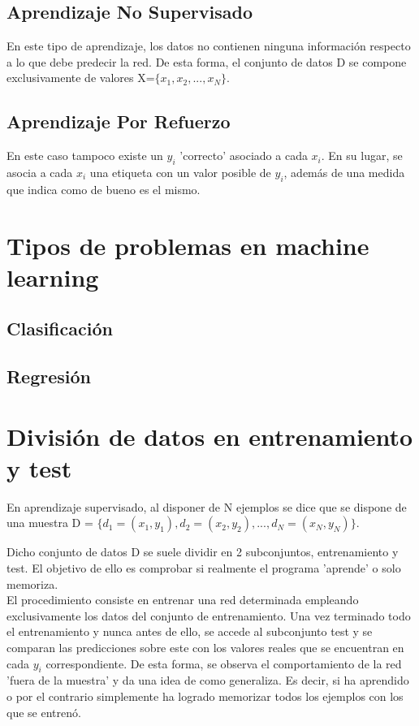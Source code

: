 \subsection{Aprendizaje No Supervisado}

En este tipo de aprendizaje, los datos no contienen ninguna información respecto a lo que debe predecir la red. De esta forma, el conjunto de datos D se compone exclusivamente de valores X=$\{x_1, x_2, ..., x_N\}$. \cite{Learning_From_Data}

\subsection{Aprendizaje Por Refuerzo}

En este caso tampoco existe un $y_i$ 'correcto' asociado a cada $x_i$. En su lugar, se asocia a cada $x_i$ una etiqueta con un valor posible de $y_i$, además de una medida que indica como de bueno es el mismo. \cite{Learning_From_Data}

\section{Tipos de problemas en machine learning}

\subsection{Clasificación}
\subsection{Regresión}


\section{División de datos en entrenamiento y test}

En aprendizaje supervisado, al disponer de N ejemplos se dice que se dispone de una muestra D = $\{d_1 = (x_1, y_1), d_2 = (x_2, y_2), ..., d_N = (x_N, y_N)\}$.

Dicho conjunto de datos D se suele dividir en 2 subconjuntos, entrenamiento y test. El objetivo de ello es comprobar si realmente el programa 'aprende' o solo memoriza.\\
El procedimiento consiste en entrenar una red determinada empleando exclusivamente los datos del conjunto de entrenamiento. Una vez terminado todo el entrenamiento y nunca antes de ello, se accede al subconjunto test y se comparan las predicciones sobre este con los valores reales que se encuentran en cada $y_i$ correspondiente. De esta forma, se observa el comportamiento de la red 'fuera de la muestra' y da una idea de como generaliza. Es decir, si ha aprendido o por el contrario simplemente ha logrado memorizar todos los ejemplos con los que se entrenó.

